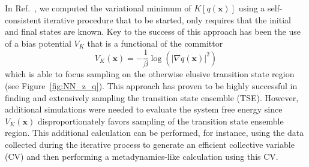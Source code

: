     In Ref.~, we computed the variational minimum of $K[q(\textbf{x})]$ using a self-consistent iterative procedure that to be started, only requires that the initial and final states are known.  
    Key to the success of this approach has been the use of a bias potential $V_K$ that is a functional of the committor
        \begin{equation}
            V_K(\textbf{x})=- \frac{1}{\beta} \log (\vert \nabla q(\textbf{x})\vert^2)
        \end{equation}
    which is able to focus sampling on the otherwise elusive transition state region (see Figure~\ref{fig:NN_z_q}).  
    This approach has proven to be highly successful in finding and extensively sampling the transition state ensemble (TSE). 
    However, additional simulations were needed to evaluate the system free energy since $V_K(\textbf{x})$ disproportionately favors sampling of the transition state ensemble region.
    This additional calculation can be performed, for instance, using the data collected during the iterative process to generate an efficient collective variable~\cite{bonati2021deep, ray2023deep} (CV) and then performing a metadynamics-like calculation using this CV.~\cite{laio2002escaping, invernizzi2020rethinking, trizio2024advanced}
    

